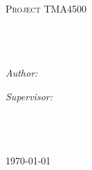 \documentclass[11pt, oneside]{Thesis} %
\begin{document}
\begin{titlepage}
\begin{center}

\textsc{\LARGE \univname}\\[1.5cm] %
\textsc{\Large Project TMA4500}\\[0.5cm] %

\HRule \\[0.4cm] %
{\huge \bfseries \ttitle}\\[0.4cm] %
\HRule \\[1.5cm] %
 
\begin{minipage}{0.4\textwidth}
\begin{flushleft} \large
\emph{Author:}\\
\href{http://www.johnsmith.com}{\authornames} %
\end{flushleft}
\end{minipage}
\begin{minipage}{0.4\textwidth}
\begin{flushright} \large
\emph{Supervisor:} \\
\href{http://www.jamessmith.com}{\supname} %
\end{flushright}
\end{minipage}\\[3cm]
 
\groupname\\\deptname\\[2cm] %
 
{\large \today}\\[4cm] %
 
\vfill
\end{center}

\end{titlepage}
\end{document}
